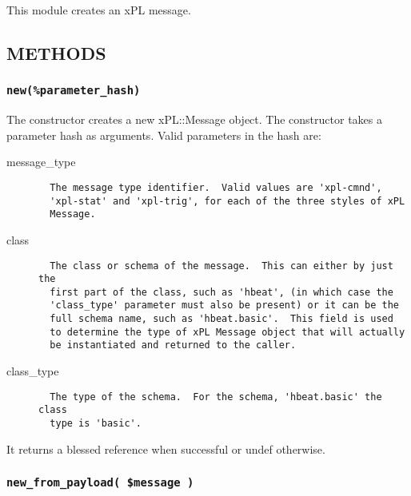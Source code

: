 This module creates an xPL message.

\subsection*{METHODS\label{xPL::Message_METHODS}}
\subsubsection*{\texttt{new(\%parameter\_hash)}\label{xPL::Message_new_parameter_hash_}}


The constructor creates a new xPL::Message object.  The constructor
takes a parameter hash as arguments.  Valid parameters in the hash
are:

\begin{description}

\item[{message\_type}] \mbox{}\begin{verbatim}
  The message type identifier.  Valid values are 'xpl-cmnd',
  'xpl-stat' and 'xpl-trig', for each of the three styles of xPL
  Message.
\end{verbatim}

\item[{class}] \mbox{}\begin{verbatim}
  The class or schema of the message.  This can either by just the
  first part of the class, such as 'hbeat', (in which case the
  'class_type' parameter must also be present) or it can be the
  full schema name, such as 'hbeat.basic'.  This field is used
  to determine the type of xPL Message object that will actually
  be instantiated and returned to the caller.
\end{verbatim}

\item[{class\_type}] \mbox{}\begin{verbatim}
  The type of the schema.  For the schema, 'hbeat.basic' the class
  type is 'basic'.
\end{verbatim}
\end{description}


It returns a blessed reference when successful or undef otherwise.

\subsubsection*{\texttt{new\_from\_payload( \$message )}\label{xPL::Message_new_from_payload_message_}}


